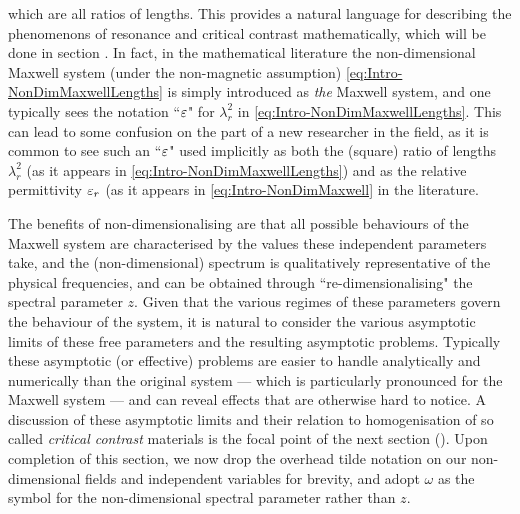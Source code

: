which are all ratios of lengths.
This provides a natural language for describing the phenomenons of resonance and critical contrast mathematically, which will be done in section .
In fact, in the mathematical literature the non-dimensional Maxwell system (under the non-magnetic assumption) \eqref{eq:Intro-NonDimMaxwellLengths} is simply introduced as \emph{the} Maxwell system, and one typically sees the notation ``$\varepsilon$" for $\lambda_r^2$ in \eqref{eq:Intro-NonDimMaxwellLengths}.
This can lead to some confusion on the part of a new researcher in the field, as it is common to see such an ``$\varepsilon$" used implicitly as both the (square) ratio of lengths $\lambda_r^2$ (as it appears in \eqref{eq:Intro-NonDimMaxwellLengths}) and as the relative permittivity $\varepsilon_r$ (as it appears in \eqref{eq:Intro-NonDimMaxwell} in the literature.

The benefits of non-dimensionalising are that all possible behaviours of the Maxwell system are characterised by the values these independent parameters take, and the (non-dimensional) spectrum is qualitatively representative of the physical frequencies, and can be obtained through ``re-dimensionalising" the spectral parameter $z$.
Given that the various regimes of these parameters govern the behaviour of the system, it is natural to consider the various asymptotic limits of these free parameters and the resulting asymptotic problems.
Typically these asymptotic (or effective) problems are easier to handle analytically and numerically than the original system --- which is particularly pronounced for the Maxwell system --- and can reveal effects that are otherwise hard to notice.
A discussion of these asymptotic limits and their relation to homogenisation of so called \emph{critical contrast} materials is the focal point of the next section ().
Upon completion of this section, we now drop the overhead tilde notation on our non-dimensional fields and independent variables for brevity, and adopt $\omega$ as the symbol for the non-dimensional spectral parameter rather than $z$.

